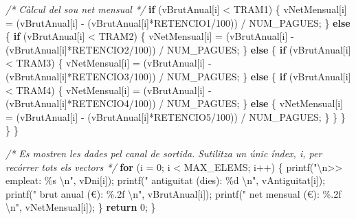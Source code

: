 \documentclass[]{book}
\newenvironment{Shaded}{\begin{snugshade}}{\end{snugshade}}
\newcommand{\CommentTok}[1]{\textcolor[rgb]{0.56,0.35,0.01}{\textit{#1}}}
\newcommand{\ControlFlowTok}[1]{\textcolor[rgb]{0.13,0.29,0.53}{\textbf{#1}}}
\newcommand{\DecValTok}[1]{\textcolor[rgb]{0.00,0.00,0.81}{#1}}
\newcommand{\NormalTok}[1]{#1}
\newcommand{\SpecialCharTok}[1]{\textcolor[rgb]{0.00,0.00,0.00}{#1}}
\newcommand{\StringTok}[1]{\textcolor[rgb]{0.31,0.60,0.02}{#1}}
\begin{document}
\begin{Shaded}
\begin{Highlighting}[]
        \CommentTok{/* Càlcul del sou net mensual */}
        \ControlFlowTok{if}\NormalTok{ (vBrutAnual[i] \textless{} TRAM1) \{}
\NormalTok{            vNetMensual[i] = (vBrutAnual[i] {-} (vBrutAnual[i]*RETENCIO1/}\DecValTok{100}\NormalTok{)) / NUM\_PAGUES;}
\NormalTok{        \} }\ControlFlowTok{else}\NormalTok{ \{}
            \ControlFlowTok{if}\NormalTok{ (vBrutAnual[i] \textless{} TRAM2) \{}
\NormalTok{                vNetMensual[i] = (vBrutAnual[i] {-} (vBrutAnual[i]*RETENCIO2/}\DecValTok{100}\NormalTok{)) / NUM\_PAGUES;}
\NormalTok{            \} }\ControlFlowTok{else}\NormalTok{ \{}
                \ControlFlowTok{if}\NormalTok{ (vBrutAnual[i] \textless{} TRAM3) \{}
\NormalTok{                    vNetMensual[i] = (vBrutAnual[i] {-} (vBrutAnual[i]*RETENCIO3/}\DecValTok{100}\NormalTok{)) / NUM\_PAGUES;}
\NormalTok{                \} }\ControlFlowTok{else}\NormalTok{ \{}
                    \ControlFlowTok{if}\NormalTok{ (vBrutAnual[i] \textless{} TRAM4) \{}
\NormalTok{                        vNetMensual[i] = (vBrutAnual[i] {-} (vBrutAnual[i]*RETENCIO4/}\DecValTok{100}\NormalTok{)) / NUM\_PAGUES;}
\NormalTok{                    \} }\ControlFlowTok{else}\NormalTok{ \{}
\NormalTok{                        vNetMensual[i] = (vBrutAnual[i] {-} (vBrutAnual[i]*RETENCIO5/}\DecValTok{100}\NormalTok{)) / NUM\_PAGUES;}
\NormalTok{                    \}}
\NormalTok{                \}}
\NormalTok{            \}}
\NormalTok{        \}}
\NormalTok{    \}}
    
    \CommentTok{/* Es mostren les dades pel canal de sortida.}
\CommentTok{       S\textquotesingle{}utilitza un únic índex, i, per recórrer tots els vectors */}
    \ControlFlowTok{for}\NormalTok{ (i = }\DecValTok{0}\NormalTok{; i \textless{} MAX\_ELEMS; i++) \{}
\NormalTok{        printf(}\StringTok{"}\SpecialCharTok{\textbackslash{}n}\StringTok{\textgreater{}\textgreater{} empleat: \%s }\SpecialCharTok{\textbackslash{}n}\StringTok{"}\NormalTok{, vDni[i]);}
\NormalTok{        printf(}\StringTok{"   antiguitat (dies): \%d }\SpecialCharTok{\textbackslash{}n}\StringTok{"}\NormalTok{, vAntiguitat[i]);}
\NormalTok{        printf(}\StringTok{"   brut anual (€): \%.2f }\SpecialCharTok{\textbackslash{}n}\StringTok{"}\NormalTok{, vBrutAnual[i]);}
\NormalTok{        printf(}\StringTok{"   net mensual (€): \%.2f }\SpecialCharTok{\textbackslash{}n}\StringTok{"}\NormalTok{, vNetMensual[i]);}
\NormalTok{    \}}
    \ControlFlowTok{return} \DecValTok{0}\NormalTok{;}
\NormalTok{\}}
\end{Highlighting}
\end{Shaded}
\end{document}

